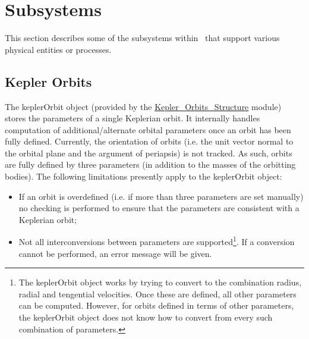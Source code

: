 \section{Subsystems}

This section describes some of the subsystems within \glc\ that support various physical entities or processes.

\subsection{Kepler Orbits}\label{sec:KeplerOrbits}

The {\normalfont \ttfamily keplerOrbit} object (provided by the \href{objects.kepler_orbits.F90:kepler_orbits_structure}{{\normalfont \ttfamily Kepler\_Orbits\_Structure}} module) stores the parameters of a single Keplerian orbit. It internally handles computation of additional/alternate orbital parameters once an orbit has been fully defined. Currently, the orientation of orbits (i.e. the unit vector normal to the orbital plane and the argument of periapsis) is not tracked. As such, orbits are fully defined by three parameters (in addition to the masses of the orbitting bodies). The following limitations presently apply to the {\normalfont \ttfamily keplerOrbit} object:
\begin{itemize}
 \item If an orbit is overdefined (i.e. if more than three parameters are set manually) no checking is performed to ensure that the parameters are consistent with a Keplerian orbit;
 \item Not all interconversions between parameters are supported\footnote{The {\normalfont \ttfamily keplerOrbit} object works by trying to convert to the combination radius, radial and tengential velocities. Once these are defined, all other parameters can be computed. However, for orbits defined in terms of other parameters, the {\normalfont \ttfamily keplerOrbit} object does not know how to convert from every such combination of parameters.}. If a conversion cannot be performed, an error message will be given. 
\end{itemize}
